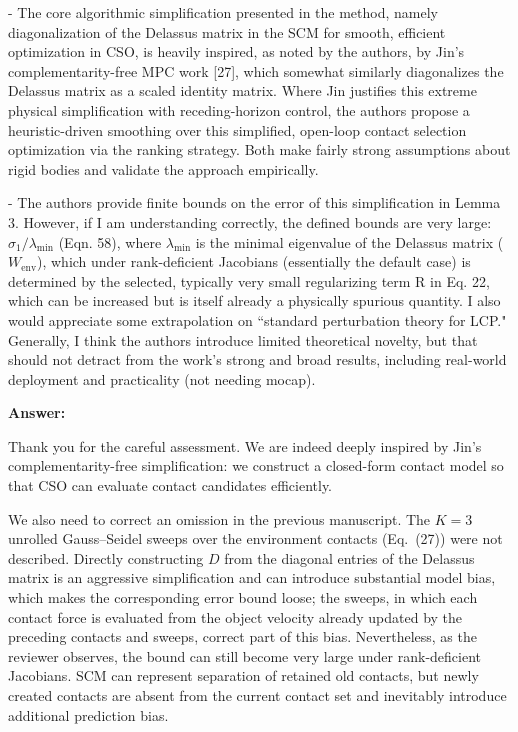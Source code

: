\documentclass[journal,10pt]{IEEEtran}
\newcommand{\answer}{\par\smallskip\noindent\color{black}\textbf{Answer: }\ignorespaces
}
\begin{document}
- The core algorithmic simplification presented in the method, namely
diagonalization of the Delassus matrix in the SCM for smooth, efficient
optimization in CSO, is heavily inspired, as noted by the authors, by
Jin’s complementarity-free MPC work [27], which somewhat similarly
diagonalizes the Delassus matrix as a scaled identity matrix. Where Jin
justifies this extreme physical simplification with receding-horizon
control, the authors propose a heuristic-driven smoothing over this
simplified, open-loop contact selection optimization via the ranking
strategy. Both make fairly strong assumptions about rigid bodies and
validate the approach empirically.

- The authors provide finite bounds on the error of this simplification
in Lemma 3. However, if I am understanding correctly, the
defined bounds are very large: $\sigma_1/\lambda_{\text{min}}$ (Eqn. 58),
where $\lambda_{\text{min}}$ is the minimal eigenvalue of the Delassus matrix
($W_{\text{env}}$), which under rank-deficient Jacobians (essentially the
default case) is determined by the selected, typically very small
regularizing term R in Eq. 22, which can be increased but is itself
already a physically spurious quantity. I also would appreciate some
extrapolation on ``standard perturbation theory for LCP." Generally, I
think the authors introduce limited theoretical novelty, but that
should not detract from the work’s strong and broad results, including
real-world deployment and practicality (not needing mocap).

\answer

Thank you for the careful assessment. We are indeed deeply inspired by Jin's complementarity-free simplification: we construct a closed-form contact model so that CSO can evaluate contact candidates efficiently. 

We also need to correct an omission in the previous manuscript. The $K=3$ unrolled Gauss--Seidel sweeps over the environment contacts (Eq.~(27)) were not described. Directly constructing $D$ from the diagonal entries of the Delassus matrix is an aggressive simplification and can introduce substantial model bias, which makes the corresponding error bound loose; the sweeps, in which each contact force is evaluated from the object velocity already updated by the preceding contacts and sweeps, correct part of this bias. Nevertheless, as the reviewer observes, the bound can still become very large under rank-deficient Jacobians. SCM can represent separation of retained old contacts, but newly created contacts are absent from the current contact set and inevitably introduce additional prediction bias.
\end{document}
